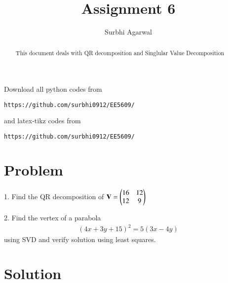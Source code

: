 \documentclass[journal,12pt,twocolumn]{IEEEtran}
\begin{document}
\let\StandardTheFigure\thefigure
\let\vec\mathbf

\renewcommand{\thefigure}{\theproblem}

\def\putbox#1#2#3{\makebox[0in][l]{\makebox[#1][l]{}\raisebox{\baselineskip}[0in][0in]{\raisebox{#2}[0in][0in]{#3}}}}
     \def\rightbox#1{\makebox[0in][r]{#1}}
     \def\centbox#1{\makebox[0in]{#1}}
     \def\topbox#1{\raisebox{-\baselineskip}[0in][0in]{#1}}
     \def\midbox#1{\raisebox{-0.5\baselineskip}[0in][0in]{#1}}
\vspace{3cm}

\title{Assignment 6}
\author{Surbhi Agarwal}

\maketitle

\newpage


\bigskip

\renewcommand{\thefigure}{\theenumi}
\renewcommand{\thetable}{\theenumi}

\begin{abstract}
This document deals with QR decomposition and Singlular Value Decomposition
\end{abstract}

Download all python codes from 
%
\begin{lstlisting}
https://github.com/surbhi0912/EE5609/
\end{lstlisting}
%
and latex-tikz codes from 
%
\begin{lstlisting}
https://github.com/surbhi0912/EE5609/
\end{lstlisting}
%
\section{Problem}
1. Find the QR decomposition of $\vec{V} = \myvec{16 & 12\\12 & 9}$

2. Find the vertex of a parabola
\begin{align}\nonumber
    (4x+3y+15)^2 = 5(3x-4y)
\end{align}
using SVD and verify solution using least squares.
\section{Solution}
\end{document}
